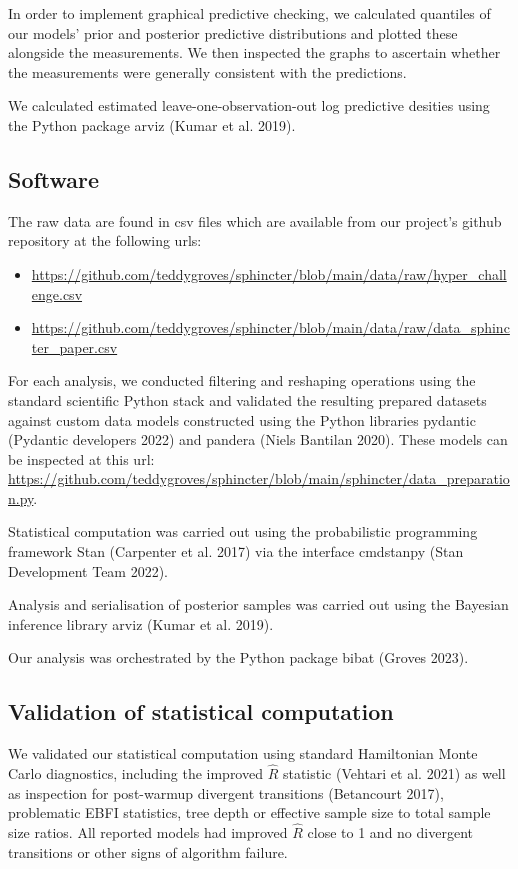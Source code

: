 \documentclass[
  letterpaper,
  DIV=11,
  numbers=noendperiod,
  oneside]{scrartcl}
\providecommand{\tightlist}{%
  \setlength{\itemsep}{0pt}\setlength{\parskip}{0pt}}\usepackage{longtable,booktabs,array}
\theoremstyle{plain}
\theoremstyle{remark}
\begin{document}
In order to implement graphical predictive checking, we calculated
quantiles of our models' prior and posterior predictive distributions
and plotted these alongside the measurements. We then inspected the
graphs to ascertain whether the measurements were generally consistent
with the predictions.

We calculated estimated leave-one-observation-out log predictive
desities using the Python package arviz (Kumar et al. 2019).

\subsection{Software}\label{software}

The raw data are found in csv files which are available from our
project's github repository at the following urls:

\begin{itemize}
\tightlist
\item
  \url{https://github.com/teddygroves/sphincter/blob/main/data/raw/hyper_challenge.csv}
\item
  \url{https://github.com/teddygroves/sphincter/blob/main/data/raw/data_sphincter_paper.csv}
\end{itemize}

For each analysis, we conducted filtering and reshaping operations using
the standard scientific Python stack and validated the resulting
prepared datasets against custom data models constructed using the
Python libraries pydantic (Pydantic developers 2022) and pandera (Niels
Bantilan 2020). These models can be inspected at this url:
\url{https://github.com/teddygroves/sphincter/blob/main/sphincter/data_preparation.py}.

Statistical computation was carried out using the probabilistic
programming framework Stan (Carpenter et al. 2017) via the interface
cmdstanpy (Stan Development Team 2022).

Analysis and serialisation of posterior samples was carried out using
the Bayesian inference library arviz (Kumar et al. 2019).

Our analysis was orchestrated by the Python package bibat (Groves 2023).

\subsection{Validation of statistical
computation}\label{validation-of-statistical-computation}

We validated our statistical computation using standard Hamiltonian
Monte Carlo diagnostics, including the improved \(\hat{R}\) statistic
(Vehtari et al. 2021) as well as inspection for post-warmup divergent
transitions (Betancourt 2017), problematic EBFI statistics, tree depth
or effective sample size to total sample size ratios. All reported
models had improved \(\hat{R}\) close to 1 and no divergent transitions
or other signs of algorithm failure.
\end{document}
